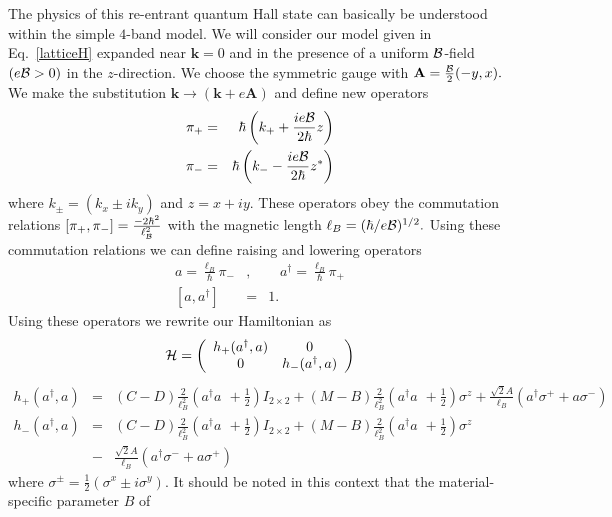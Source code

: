 \documentclass{article}
\begin{document}
The physics of this re-entrant quantum Hall state can basically be
understood within the simple $4$-band model. We will consider our
model given in Eq.~\ref{latticeH} expanded near ${\textbf{k}}=0$ and
in the presence of a uniform ${\cal{B}}$-field $(e{\cal{B}}>0)$ in
the $z$-direction. We choose the symmetric gauge with
${\textbf{A}}=\frac{{\cal{B}}}{2}(-y,x).$ We make the substitution
${\textbf{k}}\to ({\textbf{k}}+e{\textbf{A}})$ and define new
operators
\begin{eqnarray}
\pi_{+}&=&\hbar \left(k_{+}+\frac{ie{\cal{B}}}{2\hbar} z\right)\\
\pi_{-}&=&\hbar \left(k_{-}-\frac{ie{\cal{B}}}{2\hbar} z^{*}\right)
\end{eqnarray}\noindent where $k_{\pm}=(k_x\pm i k_y)$ and $z=x+i
y.$ These operators obey the commutation relations $\left[
\pi_{+},\pi_{-}\right]=\frac{-2\hbar^2}{\ell_{{\cal{B}}}^2}$ with
the magnetic length $\ell_{B}=(\hbar/e{\cal{B}})^{1/2}.$ Using these
commutation relations we can define raising and lowering operators
\begin{eqnarray}
a=\frac{\ell_{B}}{\hbar}\pi_{-}&,&\;\;\;a^{\dagger}=\frac{\ell_{B}}{\hbar}\pi_{+}\\
\left[a,a^{\dagger}\right]&=&1.
\end{eqnarray}\noindent Using these operators we rewrite our
Hamiltonian as
\begin{equation}
{\cal{H}}=\left(\begin{array}{cc} h_{+}(a^{\dagger},a)& 0\\
0&h_{-}(a^{\dagger},a)\end{array}\right)\end{equation}
\begin{eqnarray}
h_{+}(a^{\dagger},a)&=&(C-D)\frac{2}{\ell_{B}^2}(a^{\dagger}a^{\phantom{\dagger}}+\frac{1}{2})I_{2\times
2}
+(M-B)\frac{2}{\ell_{B}^2}(a^{\dagger}a^{\phantom{\dagger}}+\frac{1}{2})\sigma^z
+\frac{\sqrt{2}A}{\ell_B}(a^{\dagger}\sigma^{+}+a\sigma^{-})\nonumber\\
h_{-}(a^{\dagger},a)&=&(C-D)\frac{2}{\ell_{B}^2}(a^{\dagger}a^{\phantom{\dagger}}+\frac{1}{2})I_{2\times
2}+
(M-B)\frac{2}{\ell_{B}^2}(a^{\dagger}a^{\phantom{\dagger}}+\frac{1}{2})\sigma^z\nonumber\\
&-& \frac{\sqrt{2}A}{\ell_B}(a^{\dagger}\sigma^{-}+a\sigma^{+})
\label{bfieldH}\end{eqnarray}\noindent where
$\sigma^{\pm}=\frac{1}{2}(\sigma^x \pm i \sigma^y).$ It should be
noted in this context that the material-specific parameter $B$ of
\end{document}
